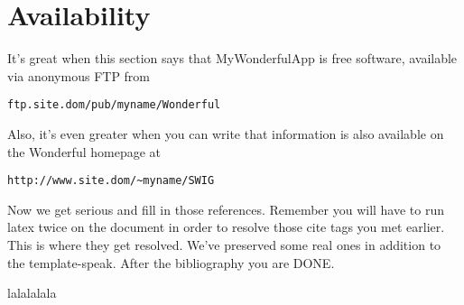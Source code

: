 \documentclass[letterpaper,twocolumn,10pt]{article}
\begin{document}
\section{Availability}

It's great when this section says that MyWonderfulApp is free software, 
available via anonymous FTP from

\begin{center}
{\tt ftp.site.dom/pub/myname/Wonderful}\\
\end{center}

Also, it's even greater when you can write that information is also 
available on the Wonderful homepage at 

\begin{center}
{\tt http://www.site.dom/\~{}myname/SWIG}
\end{center}

Now we get serious and fill in those references.  Remember you will
have to run latex twice on the document in order to resolve those
cite tags you met earlier.  This is where they get resolved.
We've preserved some real ones in addition to the template-speak.
After the bibliography you are DONE.

{\footnotesize 
}
lalalalala


\theendnotes
\end{document}
